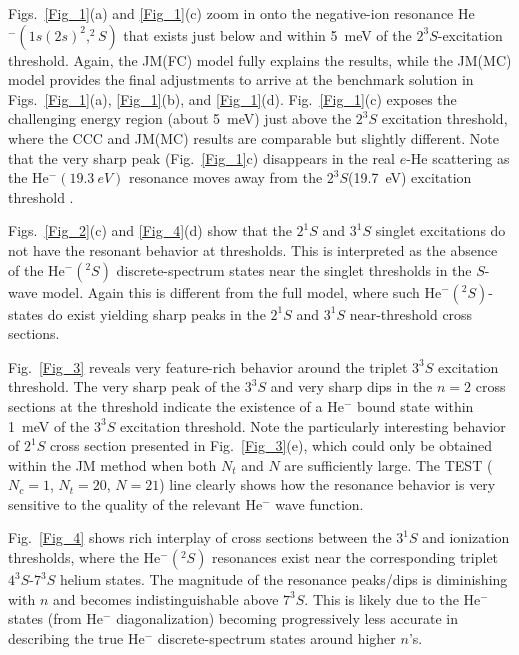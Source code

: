 \documentclass[aip
, pra
, showpacs
, aps
, twocolumn
, groupedaddress
, floatfix
]{revtex4}
\begin{document}
Figs.~\ref{Fig_1}(a) and \ref{Fig_1}(c) zoom in onto the negative-ion resonance He$^-(1s(2s)^2,^2S)$ that exists just
below and within 5~meV of the $2^3S$-excitation threshold.
Again, the JM(FC) model fully explains the results, while the JM(MC) model provides the final adjustments to
arrive at the benchmark solution in Figs.~\ref{Fig_1}(a), \ref{Fig_1}(b), and \ref{Fig_1}(d).
Fig.~\ref{Fig_1}(c) exposes the challenging energy region (about 5~meV) just above the $2^3S$ excitation threshold,
where the CCC and JM(MC) results are comparable but slightly different.
Note that the very sharp peak (Fig.~\ref{Fig_1}c) disappears in the real $e$-He scattering
\cite{KM95pL139, HBSBB96} as the He$^-(19.3~eV)$ resonance \cite{Schulz73, BC94, HY99}
moves away from the $2^3S$(19.7~eV) excitation threshold \cite{HBSBB96}.


Figs.~\ref{Fig_2}(c) and \ref{Fig_4}(d) show that the $2^1S$ and $3^1S$ singlet excitations
do not have the resonant behavior at thresholds.
This is interpreted as the absence of
the He$^-(^2S)$ discrete-spectrum states near the singlet thresholds in the $S$-wave model.
Again this is different from the full model, where such He$^-(^2S)$-states do exist yielding sharp
peaks in the $2^1S$ \cite{KM95pL139, HBSBB96} and $3^1S$ \cite{SMC2006} near-threshold cross sections.


Fig.~\ref{Fig_3} reveals very feature-rich  behavior around the triplet $3^3S$  excitation threshold.
The very sharp peak of the $3^3S$ and very sharp dips in the $n=2$ cross sections at the threshold indicate
the existence of a He$^-$ bound state within 1~meV of the  $3^3S$  excitation threshold.
Note the particularly interesting behavior of $2^1S$ cross section presented in
Fig.~\ref{Fig_3}(e), which could only be obtained within the JM method
when both $N_t$ and $N$ are sufficiently large.
The TEST ($N_c=1$, $N_t=20$, $N=21$) line clearly shows how the resonance behavior
is very sensitive to the quality of the relevant He$^-$ wave function.


Fig.~\ref{Fig_4} shows  rich interplay of cross sections between the $3^1S$ and ionization thresholds,
where the He$^-(^2S)$ resonances exist near the corresponding triplet $4^3S$-$7^3S$ helium states.
The magnitude of the resonance peaks/dips is diminishing with $n$ and becomes indistinguishable above $7^3S$.
This is likely due to the He$^-$ states (from He$^-$ diagonalization)
becoming progressively less accurate in describing the true He$^-$ discrete-spectrum states around higher $n$'s.
\end{document}
